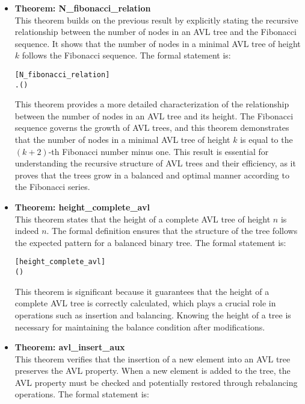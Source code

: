 \documentclass[12pt]{article}
\begin{document}
\begin{itemize}
  \item \textbf{Theorem: N\_fibonacci\_relation} \\
  This theorem builds on the previous result by explicitly stating the recursive relationship between the number of nodes in an AVL tree and the Fibonacci sequence. It shows that the number of nodes in a minimal AVL tree of height \( k \) follows the Fibonacci sequence. The formal statement is:

\begin{alltt}
[N_fibonacci_relation]
\HOLTokenTurnstile{} \HOLSymConst{\HOLTokenForall{}}.   \HOLSymConst{=}  ( \HOLSymConst{\ensuremath{+}} ) \HOLSymConst{\ensuremath{-}}  
\end{alltt}

  This theorem provides a more detailed characterization of the relationship between the number of nodes in an AVL tree and its height. The Fibonacci sequence governs the growth of AVL trees, and this theorem demonstrates that the number of nodes in a minimal AVL tree of height \( k \) is equal to the \( (k+2) \)-th Fibonacci number minus one. This result is essential for understanding the recursive structure of AVL trees and their efficiency, as it proves that the trees grow in a balanced and optimal manner according to the Fibonacci series.
  
  \item \textbf{Theorem: height\_complete\_avl} \\
  This theorem states that the height of a complete AVL tree of height \( n \) is indeed \( n \). The formal definition ensures that the structure of the tree follows the expected pattern for a balanced binary tree. The formal statement is:

\begin{alltt}
[height_complete_avl]
\HOLTokenTurnstile{}  ( ) \HOLSymConst{=} 
\end{alltt}

  This theorem is significant because it guarantees that the height of a complete AVL tree is correctly calculated, which plays a crucial role in operations such as insertion and balancing. Knowing the height of a tree is necessary for maintaining the balance condition after modifications.

  \item \textbf{Theorem: avl\_insert\_aux} \\
  This theorem verifies that the insertion of a new element into an AVL tree preserves the AVL property. When a new element is added to the tree, the AVL property must be checked and potentially restored through rebalancing operations. The formal statement is:


\end{itemize}
\end{document}
